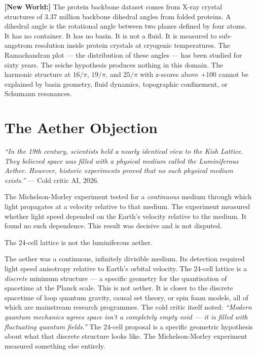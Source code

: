 \documentclass[11pt, letterpaper, openany]{book}
\newcommand{\newworld}[1]{\noindent\textbf{\color{kishblue}[New World:]}
  #1\medskip}
\begin{document}
\newworld{The protein backbone dataset comes from X-ray crystal
structures of 3.37 million backbone dihedral angles from folded
proteins. A dihedral angle is the rotational angle between two
planes defined by four atoms. It has no container. It has no basin.
It is not a fluid. It is measured to sub-angstrom resolution inside
protein crystals at cryogenic temperatures. The Ramachandran plot ---
the distribution of these angles --- has been studied for sixty years.
The seiche hypothesis produces nothing in this domain.
The harmonic structure at $16/\pi$, $19/\pi$, and $25/\pi$
with z-scores above $+100$ cannot be explained by basin geometry,
fluid dynamics, topographic confinement, or Schumann resonances.}

\section{The Aether Objection}

\begin{objectionbox}
\textit{``In the 19th century, scientists held a nearly identical
view to the Kish Lattice. They believed space was filled with a
physical medium called the Luminiferous Aether. However, historic
experiments proved that no such physical medium exists.''} ---
Cold critic AI, 2026.
\end{objectionbox}

The Michelson-Morley experiment tested for a \textit{continuous}
medium through which light propagates at a velocity relative to
that medium. The experiment measured whether light speed depended
on the Earth's velocity relative to the medium. It found no
such dependence. This result was decisive and is not disputed.

The 24-cell lattice is not the luminiferous aether.

The aether was a continuous, infinitely divisible medium. Its
detection required light speed anisotropy relative to Earth's
orbital velocity. The 24-cell lattice is a \textit{discrete}
minimum structure --- a specific geometry for the quantisation
of spacetime at the Planck scale. This is not aether. It is
closer to the discrete spacetime of loop quantum gravity,
causal set theory, or spin foam models, all of which are
mainstream research programmes. The cold critic itself noted:
\textit{``Modern quantum mechanics agrees space isn't a completely
empty void --- it is filled with fluctuating quantum fields.''}
The 24-cell proposal is a specific geometric hypothesis about
what that discrete structure looks like. The Michelson-Morley
experiment measured something else entirely.
\end{document}
